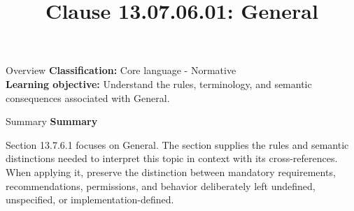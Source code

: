\documentclass[10pt,letterpaper]{article}
\title{Clause 13.07.06.01: General}
\author{}
\date{}
\begin{document}
\maketitle
\begin{CornellOverviewBox}{Overview}
\textbf{Classification:} Core language - Normative\\[2pt]
\textbf{Learning objective:} Understand the rules, terminology, and semantic consequences associated with General.
\end{CornellOverviewBox}\begin{CornellSummaryBox}{Summary}
{\sffamily\bfseries\color{Accent} Summary}\par\vspace{3pt}Section 13.7.6.1 focuses on General. The section supplies the rules and semantic distinctions needed to interpret this topic in context with its cross-references. When applying it, preserve the distinction between mandatory requirements, recommendations, permissions, and behavior deliberately left undefined, unspecified, or implementation-defined.
\end{CornellSummaryBox}
\end{document}
